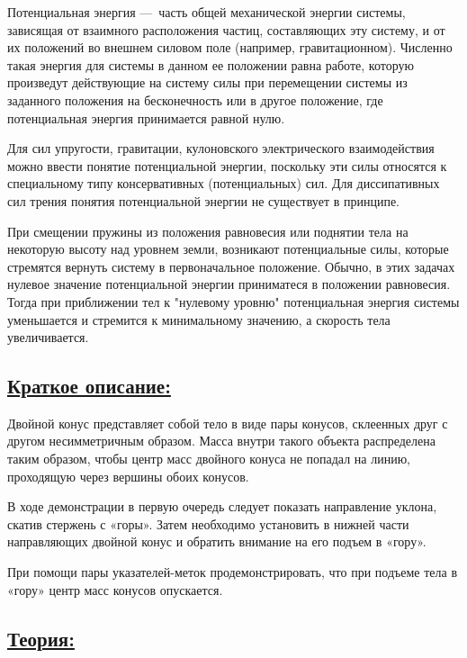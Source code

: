 \documentclass[14pt,a4paper,oneside]{extarticle}	%
\begin{document}
	Потенциальная энергия — часть общей механической энергии системы, зависящая от взаимного расположения частиц, составляющих эту систему, и от их положений во внешнем силовом поле (например, гравитационном).
	Численно такая энергия для системы в данном ее положении равна работе, которую произведут действующие на систему силы при перемещении системы из заданного положения на бесконечность или в другое положение, где потенциальная энергия принимается равной нулю.
	
	Для сил упругости, гравитации, кулоновского электрического взаимодействия можно ввести понятие потенциальной энергии, поскольку эти силы относятся к специальному типу консервативных (потенциальных) сил.
	Для диссипативных сил трения понятия потенциальной энергии не существует в принципе.
	
	При смещении пружины из положения равновесия или поднятии тела на некоторую высоту над уровнем земли, возникают потенциальные силы, которые стремятся вернуть систему в первоначальное положение.
	Обычно, в этих задачах нулевое значение потенциальной энергии приниматеся в положении равновесия.
	Тогда при приближении тел к "нулевому уровню" потенциальная энергия системы уменьшается и стремится к минимальному значению, а скорость тела увеличивается.
	
	\subsection*{\underline{Краткое описание:}}
		
		Двойной конус представляет собой тело в виде пары конусов, склеенных друг с другом несимметричным образом.
		Масса внутри такого объекта распределена таким образом, чтобы центр масс двойного конуса не попадал на линию, проходящую через вершины обоих конусов. %
		
		В ходе демонстрации в первую очередь следует показать направление уклона, скатив стержень с «горы».
		Затем необходимо установить в нижней части направляющих двойной конус и обратить внимание на его подъем в «гору».
		
		При помощи пары указателей-меток продемонстрировать, что при подъеме тела в «гору» центр масс конусов опускается.

	\newpage	
		\subsection*{\underline{Теория:}}
\end{document}
